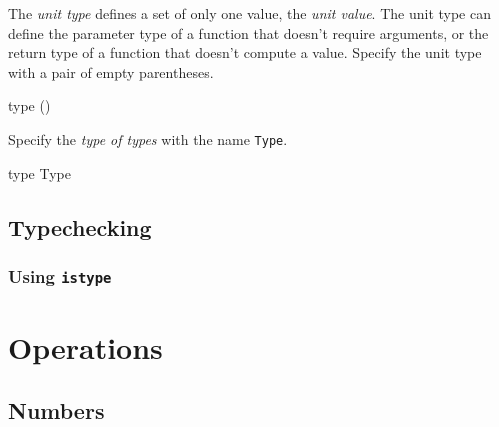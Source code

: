 \documentclass[11pt]{article}
\newcommand{\literal}[1]{\lstinline[style=DSL,identifierstyle=\itshape]!#1!}
\newcommand{\variable}[1]{\literal{#1}}
\begin{document}
The \textit{unit type} defines a set of only one value, the \textit{unit value}.
The unit type can define the parameter type of a function that doesn't require arguments,
or the return type of a function that doesn't compute a value.
Specify the unit type with a pair of empty parentheses.

\begin{dsl}
type ()
\end{dsl}

Specify the \textit{type of types} with the name \literal{Type}.

\begin{dsl}
type Type
\end{dsl}

\subsection{Typechecking}

\subsubsection{Using \variable{istype}}


\newpage
\section {Operations}
\subsection {Numbers}
\end{document}
